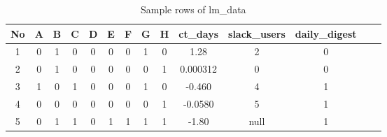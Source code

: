 
\newcommand*\rot{\rotatebox{90}}
\begin{table}[h]
\begin{center}
\begin{tabular}{|c|c|c|c|c|c|c|c|c|c|c|c|c|c|} 
\hline

No & A & B & C & D & E & F & G & H & ct\_days & slack\_users & daily\_digest \\ [0.5ex]
\hline\hline

1 & 0 & 1 & 0 & 0 & 0 & 0 & 1 & 0 & 1.28 & 2 & 0 \\
2 & 0 & 1 & 0 & 0 & 0 & 0 & 0 & 1 & 0.000312 & 0 & 0 \\ 
3 & 1 & 0 & 1 & 0 & 0 & 0 & 1 & 0 & -0.460 & 4 & 1 \\
4 & 0 & 0 & 0 & 0 & 0 & 0 & 0 & 1 & -0.0580 & 5 & 1 \\
5 & 0 & 1 & 1 & 0 & 1 & 1 & 1 & 1 & -1.80 & null & 1 \\

\hline
\end{tabular}
\caption{Sample rows of lm\_data}
\label{tab:dataExample}
\end{center}
\end{table}

